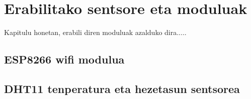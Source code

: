 \chapter{Erabilitako sentsore eta moduluak}

\vspace{4cm}

Kapitulu honetan, erabili diren moduluak azalduko dira.....

\newpage

\section{ESP8266 wifi modulua}
\section{DHT11 tenperatura eta hezetasun sentsorea}